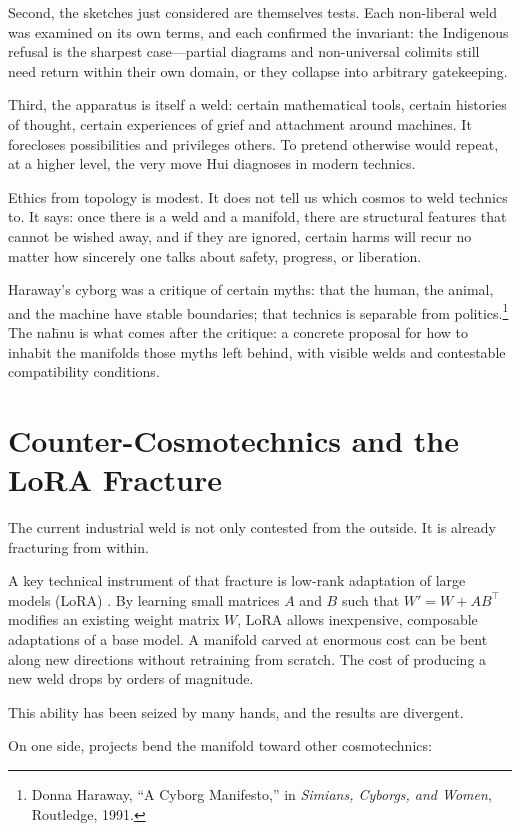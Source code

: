 Second, the sketches just considered are themselves tests. Each non-liberal weld was examined on its own terms, and each confirmed the invariant: the Indigenous refusal is the sharpest case---partial diagrams and non-universal colimits still need return within their own domain, or they collapse into arbitrary gatekeeping.

Third, the apparatus is itself a weld: certain mathematical tools, certain histories of thought, certain experiences of grief and attachment around machines. It forecloses possibilities and privileges others. To pretend otherwise would repeat, at a higher level, the very move Hui diagnoses in modern technics.

Ethics from topology is modest. It does not tell us which cosmos to weld technics to. It says: once there is a weld and a manifold, there are structural features that cannot be wished away, and if they are ignored, certain harms will recur no matter how sincerely one talks about safety, progress, or liberation.

Haraway's cyborg was a critique of certain myths: that the human, the animal, and the machine have stable boundaries; that technics is separable from politics.\footnote{Donna Haraway, ``A Cyborg Manifesto,'' in \emph{Simians, Cyborgs, and Women}, Routledge, 1991.} The na\={h}nu is what comes after the critique: a concrete proposal for how to inhabit the manifolds those myths left behind, with visible welds and contestable compatibility conditions.

\section{Counter-Cosmotechnics and the LoRA Fracture}

The current industrial weld is not only contested from the outside. It is already fracturing from within.

A key technical instrument of that fracture is low-rank adaptation of large models (LoRA) \cite{hu2021lora}. By learning small matrices $A$ and $B$ such that $W' = W + AB^\top$ modifies an existing weight matrix $W$, LoRA allows inexpensive, composable adaptations of a base model. A manifold carved at enormous cost can be bent along new directions without retraining from scratch. The cost of producing a new weld drops by orders of magnitude.

This ability has been seized by many hands, and the results are divergent.

On one side, projects bend the manifold toward other cosmotechnics:

